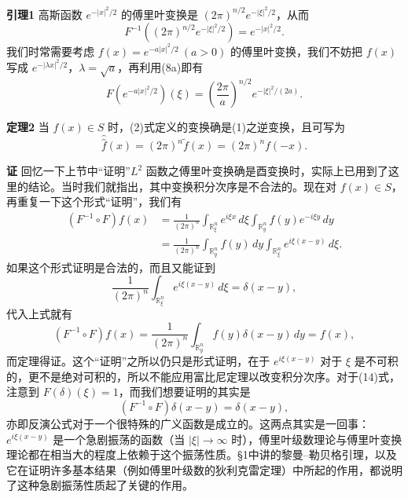 \noindent\textbf{引理1}\quad
高斯函数 $e^{-|x|^2/2}$ 的傅里叶变换是 $(2\pi)^{n/2}e^{-|\xi|^2/2}$，从而
\[
 F^{-1}\!\left((2\pi)^{n/2}e^{-|\xi|^2/2}\right)=e^{-|x|^2/2}.
\]
我们时常需要考虑 $f(x)=e^{-a|x|^2/2}\ (a>0)$ 的傅里叶变换，我们不妨把 $f(x)$ 写成 $e^{-|\lambda x|^2/2}$，$\lambda=\sqrt a$，再利用(8a)即有
\begin{equation}
 F\!\left(e^{-a|x|^2/2}\right)(\xi)=\left(\frac{2\pi}{a}\right)^{n/2}e^{-|\xi|^2/(2a)}.
 \tag{12}
\end{equation}

\noindent\textbf{定理2}\quad
当 $f(x)\in S$ 时，(2)式定义的变换确是(1)之逆变换，且可写为
\begin{equation}
 \widehat{\widehat f}(x)=(2\pi)^n\widetilde f(x)=(2\pi)^n f(-x).
 \tag{13}
\end{equation}

\noindent\textbf{证}\quad
回忆一下上节中“证明”$L^2$ 函数之傅里叶变换确是酉变换时，实际上已用到了这里的结论。当时我们就指出，其中变换积分次序是不合法的。现在对 $f(x)\in S$，再重复一下这个形式“证明”，我们有
\[
 \begin{aligned}
 (F^{-1}\circ F)f(x)
 &=\frac1{(2\pi)^n}\int_{\mathbb R^n_\xi}e^{i\xi x}\,d\xi
   \int_{\mathbb R^n_y}f(y)e^{-i\xi y}\,dy\\
 &=\frac1{(2\pi)^n}\int_{\mathbb R^n_y}f(y)\,dy
   \int_{\mathbb R^n_\xi}e^{i\xi(x-y)}\,d\xi.
 \end{aligned}
\]
如果这个形式证明是合法的，而且又能证到
\begin{equation}
 \frac1{(2\pi)^n}\int_{\mathbb R^n_\xi}e^{i\xi(x-y)}\,d\xi=\delta(x-y),
 \tag{14}
\end{equation}
代入上式就有
\[
 (F^{-1}\circ F)f(x)=\frac1{(2\pi)^n}\int_{\mathbb R^n_y}f(y)\delta(x-y)\,dy=f(x),
\]
而定理得证。这个“证明”之所以仍只是形式证明，在于 $e^{i\xi(x-y)}$ 对于 $\xi$ 是不可积的，更不是绝对可积的，所以不能应用富比尼定理以改变积分次序。对于(14)式，注意到 $F(\delta)(\xi)=1$，而我们想要证明的其实是
\begin{equation}
 (F^{-1}\circ F)\delta(x-y)=\delta(x-y),
 \tag{15}
\end{equation}
亦即反演公式对于一个很特殊的广义函数是成立的。这两点其实是一回事：$e^{i\xi(x-y)}$ 是一个急剧振荡的函数（当 $|\xi|\to\infty$ 时），傅里叶级数理论与傅里叶变换理论都在相当大的程度上依赖于这个振荡性质。§1中讲的黎曼--勒贝格引理，以及它在证明许多基本结果（例如傅里叶级数的狄利克雷定理）中所起的作用，都说明了这种急剧振荡性质起了关键的作用。

